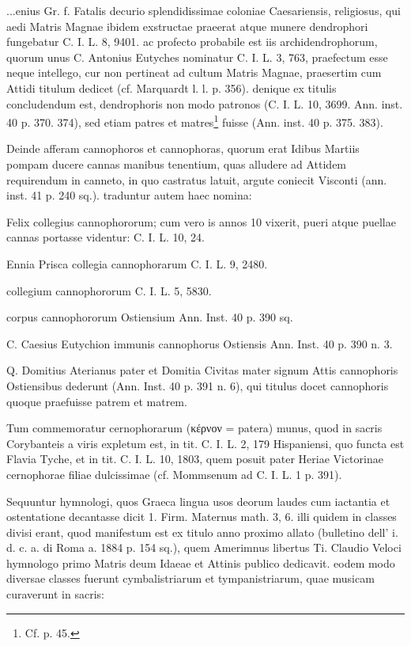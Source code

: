 \documentclass[a4paper, 11pt, oneside, polutonikogreek, german, twocolumn]{article}
\begin{document}
...enius Gr. f. Fatalis decurio splendidissimae coloniae Caesariensis, religiosus, qui aedi Matris Magnae ibidem exstructae praeerat atque munere dendrophori fungebatur C. I. L. 8, 9401. ac profecto probabile est iis archidendrophorum, quorum unus C. Antonius Eutyches nominatur C. I. L. 3, 763, praefectum esse neque intellego, cur non pertineat ad cultum Matris Magnae, praesertim cum Attidi titulum dedicet (cf. Marquardt l. l. p. 356). denique ex titulis concludendum est, dendrophoris non modo patronos (C. I. L. 10, 3699. Ann. inst. 40 p. 370. 374), sed etiam patres et matres\footnote{Cf. p. 45.} fuisse (Ann. inst. 40 p. 375. 383).

Deinde afferam cannophoros et cannophoras, quorum erat Idibus Martiis pompam ducere cannas manibus tenentium, quas alludere ad Attidem requirendum in canneto, in quo castratus latuit, argute coniecit Visconti (ann. inst. 41 p. 240 sq.). traduntur autem haec nomina:

Felix collegius cannophororum; cum vero is annos 10 vixerit, pueri atque puellae cannas portasse videntur: C. I. L. 10, 24.

Ennia Prisca collegia cannophorarum C. I. L. 9, 2480.

collegium cannophororum C. I. L. 5, 5830.

corpus cannophororum Ostiensium Ann. Inst. 40 p. 390 sq.

C. Caesius Eutychion immunis cannophorus Ostiensis Ann. Inst. 40 p. 390 n. 3.

Q. Domitius Aterianus pater et Domitia Civitas mater signum Attis cannophoris Ostiensibus dederunt (Ann. Inst. 40 p. 391 n. 6), qui titulus docet cannophoris quoque praefuisse patrem et matrem.

Tum commemoratur cernophorarum (κέρνον = patera) munus, quod in sacris Corybanteis a viris expletum est, in tit. C. I. L. 2, 179 Hispaniensi, quo functa est Flavia Tyche, et in tit. C. I. L. 10, 1803, quem posuit pater Heriae Victorinae cernophorae filiae dulcissimae (cf. Mommsenum ad C. I. L. 1 p. 391).

Sequuntur hymnologi, quos Graeca lingua usos deorum laudes cum iactantia et ostentatione decantasse dicit 1. Firm. Maternus math. 3, 6. illi quidem in classes divisi erant, quod manifestum est ex titulo anno proximo allato (bulletino dell' i. d. c. a. di Roma a. 1884 p. 154 sq.), quem Amerimnus libertus Ti. Claudio Veloci hymnologo primo Matris deum Idaeae et Attinis publico dedicavit. eodem modo diversae classes fuerunt cymbalistriarum et tympanistriarum, quae musicam curaverunt in sacris:
\end{document}
